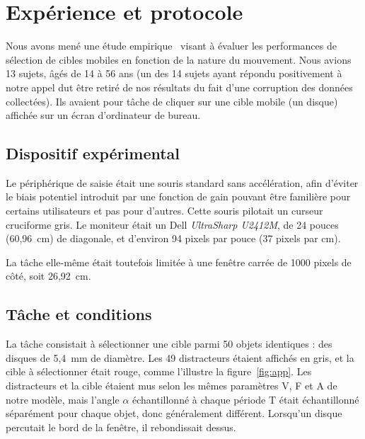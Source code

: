 \section{Expérience et protocole}
\label{sub:interact}
	Nous avons mené une étude empirique~\cite{kouyoumdjian2015characterizing} visant à évaluer les performances de sélection de cibles mobiles en fonction de la nature du mouvement. Nous avions 13 sujets, âgés de 14 à 56 ans (un des 14 sujets ayant répondu positivement à notre appel dut être retiré de nos résultats du fait d'une corruption des données collectées). Ils avaient pour tâche de cliquer sur une cible mobile (un disque) affichée sur un écran d'ordinateur de bureau.

	\subsection{Dispositif expérimental}
	Le périphérique de saisie était une souris standard sans accélération, afin d'éviter le biais potentiel introduit par une fonction de gain pouvant être familière pour certains utilisateurs et pas pour d'autres. Cette souris pilotait un curseur cruciforme gris. Le moniteur était un Dell \emph{UltraSharp U2412M},\footnotemark{} de 24 pouces (60,96~cm) de diagonale, et d'environ 94 pixels par pouce (37 pixels par cm).
	
	La tâche elle-même était toutefois limitée à une fenêtre carrée de 1000 pixels de côté, soit 26,92~cm.


	\subsection{Tâche et conditions}
	La tâche consistait à sélectionner une cible parmi 50 objets identiques : des disques de 5,4~mm de diamètre. Les 49 \og distracteurs \fg{} étaient affichés en gris, et la cible à sélectionner était rouge, comme l'illustre la figure~\ref{fig:app}. Les distracteurs et la cible étaient mus selon les mêmes paramètres V, F et A de notre modèle, mais l'angle $\alpha$ échantillonné à chaque période T était échantillonné séparément pour chaque objet, donc généralement différent. Lorsqu'un disque \og percutait \fg{} le bord de la fenêtre, il \og rebondissait \fg{} dessus.
	
